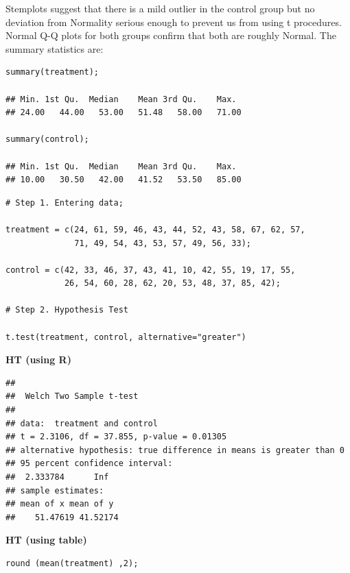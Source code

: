 \begin{example}
\begin{minipage}{\textwidth}
\vspace{-0.5em}

\label{fig:qqplot-ggplot}
\end{minipage}

\vspace{1.00em}
Stemplots suggest that there is a mild outlier in the control group but no deviation from Normality serious enough to prevent us from using t procedures. Normal Q-Q plots for both groups confirm that both are roughly Normal. The summary statistics are:
\begin{tcolorbox}[colback=gray!10, colframe=black!45, arc=2mm, before skip=4pt, after skip=4pt]
\begin{verbatim}
summary(treatment);

## Min. 1st Qu.  Median    Mean 3rd Qu.    Max. 
## 24.00   44.00   53.00   51.48   58.00   71.00

summary(control);

## Min. 1st Qu.  Median    Mean 3rd Qu.    Max. 
## 10.00   30.50   42.00   41.52   53.50   85.00
\end{verbatim}
\end{tcolorbox}

\begin{tcolorbox}[colback=gray!10, colframe=black!45, arc=2mm, before skip=4pt, after skip=4pt]
\begin{verbatim}
# Step 1. Entering data;

treatment = c(24, 61, 59, 46, 43, 44, 52, 43, 58, 67, 62, 57, 
              71, 49, 54, 43, 53, 57, 49, 56, 33);
              
control = c(42, 33, 46, 37, 43, 41, 10, 42, 55, 19, 17, 55, 
            26, 54, 60, 28, 62, 20, 53, 48, 37, 85, 42);

# Step 2. Hypothesis Test

t.test(treatment, control, alternative="greater")
\end{verbatim}
\end{tcolorbox}
\noindent\textbf{HT (using R)}
\begin{tcolorbox}[colback=gray!10, colframe=black!45, arc=2mm, before skip=4pt, after skip=4pt]
\begin{verbatim}
##
##  Welch Two Sample t-test
## 
## data:  treatment and control
## t = 2.3106, df = 37.855, p-value = 0.01305
## alternative hypothesis: true difference in means is greater than 0
## 95 percent confidence interval:
##  2.333784      Inf
## sample estimates:
## mean of x mean of y 
##    51.47619 41.52174 
\end{verbatim}
\end{tcolorbox}
\noindent\textbf{HT (using table)}
\begin{tcolorbox}[colback=gray!10, colframe=black!45, arc=2mm, before skip=4pt, after skip=4pt]
\begin{verbatim}
round (mean(treatment) ,2);


\end{verbatim}
\end{tcolorbox}
\end{example}
